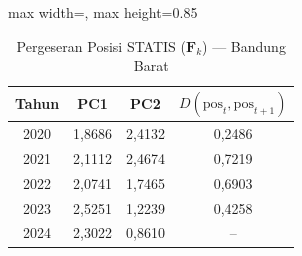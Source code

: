 \begin{table}[H]
\centering
\caption{Pergeseran Posisi STATIS ($\mathbf{F}_k$) --- Bandung Barat} \label{tab:app2jarak_statis_skor_bandung_barat}
\begin{adjustbox}{max width=\textwidth, max height=0.85\textheight}
\begin{tabular}{|c|c|c|c|}
\hline
\textbf{Tahun} & \textbf{PC1} & \textbf{PC2} & \textbf{$D(\text{pos}_t, \text{pos}_{t+1})$} \\
\hline
2020 & 1,8686 & 2,4132 & 0,2486 \\
2021 & 2,1112 & 2,4674 & 0,7219 \\
2022 & 2,0741 & 1,7465 & 0,6903 \\
2023 & 2,5251 & 1,2239 & 0,4258 \\
2024 & 2,3022 & 0,8610 & -- \\
\hline
\end{tabular}
\end{adjustbox}
\end{table}